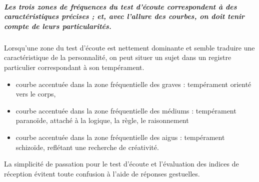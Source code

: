 \subparagraph{Les trois zones de fréquences du test d'écoute correspondent à des
caractéristiques précises ; et, avec l'allure des courbes, on doit
tenir compte de leurs particularités.}

Lorsqu'une zone du test d'écoute est nettement dominante et semble
traduire une caractéristique de la personnalité, on peut situer un
sujet dans un registre particulier correspondant à son tempérament.

\begin{itemize}
	\item courbe accentuée dans la zone fréquentielle des graves : tempérament
	orienté vers le corps,
	
	\item courbe accentuée dans la zone fréquentielle des médiums : tempérament
	paranoïde, attaché à la logique, la règle, le raisonnement 
	
	\item courbe accentuée dans la zone fréquentielle des aigus : tempérament
	schizoïde, reflétant une recherche de créativité. 
\end{itemize}


La simplicité de
passation pour le test d'écoute et 
 l'évaluation des indices de réception évitent toute confusion
à l'aide de réponses gestuelles.



 






